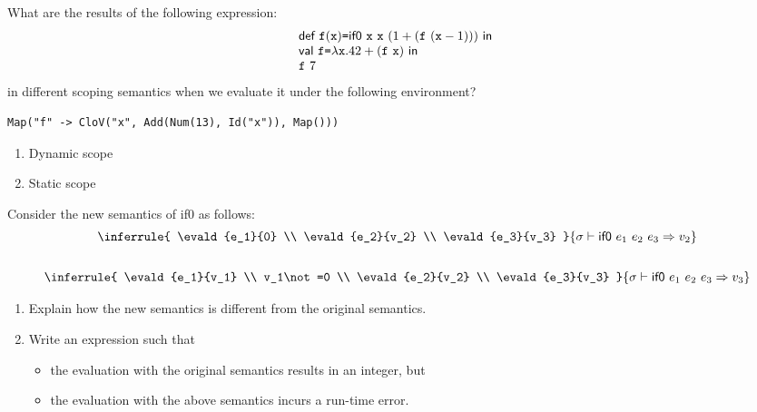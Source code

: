 \begin{exercise}

What are the results of the following expression:
\[
  \begin{array}{l}
  \textsf{def}\ \texttt{f}(\texttt{x})\texttt{=}\textsf{if0}\ \texttt{x}\ \texttt{x}\ (1+(\texttt{f}\ (\texttt{x}-1)))\ \textsf{in}\ \\
  \textsf{val}\ \texttt{f}\texttt{=}\lambda\texttt{x}.42+(\texttt{f}\ \texttt{x})\ \textsf{in}\ \\
  \texttt{f}\ 7
 
 
  \end{array}
\]
in different scoping semantics when we evaluate it under the following environment?
\begin{verbatim}
Map("f" -> CloV("x", Add(Num(13), Id("x")), Map()))
\end{verbatim}

\begin{enumerate}
  \item Dynamic scope
  \item Static scope
\end{enumerate}

\end{exercise}

\begin{exercise}

  Consider the new semantics of \textsf{if0} as follows:
\[
  \begin{array}{c}
  \inferrule
  { \evald{e_1}{0} \\ \evald{e_2}{v_2} \\ \evald{e_3}{v_3} }
  { \evald{\eifz{e_1}{e_2}{e_3}}{v_2} }
  \\[2em]
  \inferrule
  { \evald{e_1}{v_1} \\ v_1\not=0 \\ \evald{e_2}{v_2} \\ \evald{e_3}{v_3} }
  { \evald{\eifz{e_1}{e_2}{e_3}}{v_3} }
  \end{array}
\]

\begin{enumerate}
  \item Explain how the new semantics is different from the original semantics.
  \item Write an \Lang expression such that
  \begin{itemize}
    \item the evaluation with the original semantics results in an integer, but
    \item the evaluation with the above semantics incurs a run-time error.
  \end{itemize}
\end{enumerate}

\end{exercise}

